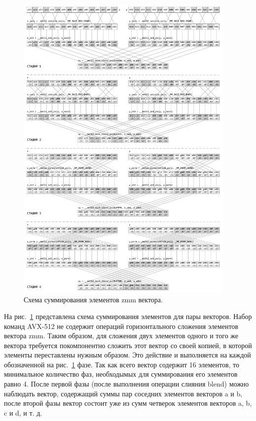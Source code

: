 \begin{figure}[!ht]
\centering
\includegraphics[width=0.95\textwidth]{./fig/vec_horizontal_add.pdf}
\singlespacing
{}\caption{Схема суммирования элементов zmm вектора.}
\label{fig:text_4_small_matr_horizontal_add}
\end{figure}

На рис.~\ref{fig:text_4_small_matr_horizontal_add} представлена схема суммирования элементов для пары векторов.
Набор команд AVX-512 не содержит операций горизонтального сложения элементов вектора zmm.
Таким образом, для сложения двух элементов одного и того же вектора требуется покомпонентно сложить этот вектор со своей копией, в которой элементы переставлены нужным образом.
Это действие и выполняется на каждой обозначенной на рис.~\ref{fig:text_4_small_matr_horizontal_add} фазе.
Так как всего вектор содержит 16 элементов, то минимальное количество фаз, необходымых для суммирования его элементов равно 4.
После первой фазы (после выполнения операции слияния blend) можно наблюдать вектор, содержащий суммы пар соседних элементов векторов a и b, после второй фазы вектор состоит уже из сумм четверок элементов векторов a, b, c и d, и т. д.

